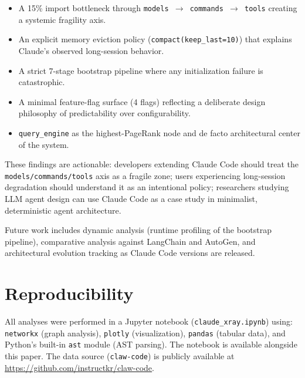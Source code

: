 \documentclass[conference]{IEEEtran}
\begin{document}
\begin{itemize}
  \item A 15\% import bottleneck through
        \texttt{models $\to$ commands $\to$ tools} creating a systemic
        fragility axis.
  \item An explicit memory eviction policy (\texttt{compact(keep\_last=10)})
        that explains Claude's observed long-session behavior.
  \item A strict 7-stage bootstrap pipeline where any initialization
        failure is catastrophic.
  \item A minimal feature-flag surface (4 flags) reflecting a deliberate
        design philosophy of predictability over configurability.
  \item \texttt{query\_engine} as the highest-PageRank node and de facto
        architectural center of the system.
\end{itemize}

These findings are actionable: developers extending Claude Code should
treat the \texttt{models/commands/tools} axis as a fragile zone; users
experiencing long-session degradation should understand it as an
intentional policy; researchers studying LLM agent design can use
Claude Code as a case study in minimalist, deterministic agent
architecture.

Future work includes dynamic analysis (runtime profiling of the
bootstrap pipeline), comparative analysis against LangChain and
AutoGen, and architectural evolution tracking as Claude Code versions
are released.

\appendix
\section{Reproducibility}

All analyses were performed in a Jupyter notebook
(\texttt{claude\_xray.ipynb}) using: \texttt{networkx} (graph
analysis), \texttt{plotly} (visualization), \texttt{pandas} (tabular
data), and Python's built-in \texttt{ast} module (AST parsing). The
notebook is available alongside this paper. The data source
(\texttt{claw-code}) is publicly available at
\url{https://github.com/instructkr/claw-code}.
\end{document}

